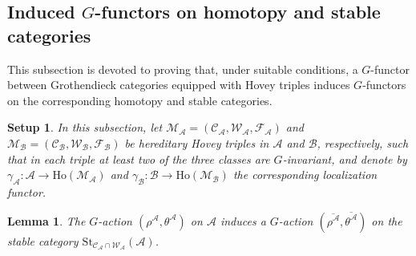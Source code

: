 \documentclass[12pt,twoside]{amsart}
\theoremstyle{bfupright head,slanted body}
\theoremstyle{bfupright head,upright body}
\theoremstyle{fixed bf head,slanted body}
\newtheorem{lem}[res]{Lemma}            \newtheorem*{lem*}{Lemma}
\theoremstyle{fixed bf head,upright body}
\newtheorem{setup}[res]{Setup}           \newtheorem*{setup*}{Setup}
\theoremstyle{numbered paragraph}
\numberwithin{equation}{res}
\newcommand{\calC}{\mathcal{C}}
\newcommand{\calW}{\mathcal{W}}
\newcommand{\calF}{\mathcal{F}}
\newcommand{\calA}{\mathcal{A}}
\newcommand{\calB}{\mathcal{B}}
\newcommand{\calM}{\mathcal{M}}
\newcommand{\calX}{\mathcal{X}}
\newcommand{\Ho}{\mathrm{Ho}}
\newcommand{\St}{\mathrm{St}}
\begin{document}
\subsection{Induced $G$-functors on homotopy and stable categories} \label{ThmB(1)}
This subsection is devoted to proving that, under suitable conditions, a \(G\)-functor between Grothendieck categories equipped with Hovey triples induces \(G\)-functors on the corresponding homotopy and stable categories.

\begin{setup}
In this subsection, let \(\calM_\calA=(\calC_\calA,\calW_\calA,\calF_\calA)\) and \(\calM_\calB=(\calC_\calB,\calW_\calB,\calF_\calB)\) be hereditary Hovey triples in \(\calA\) and \(\calB\), respectively, such that in each triple at least two of the three classes are \(G\)-invariant, and denote by $\gamma_{\calA}: \calA \to \Ho(\calM_\calA)$ and $\gamma_{\calB}: \calB \to \Ho(\calM_\calB)$ the corresponding localization functor.
\end{setup}



\begin{lem} \label{G-act for St(A)}
The \(G\)-action \((\rho^\calA,\theta^\calA)\) on \(\calA\) induces a \(G\)-action \((\overline{\rho^\calA},\overline{\theta^\calA})\) on the stable category \(\St_{\calC_\calA \cap \calW_\calA}(\calA)\).
\end{lem}
\end{document}

